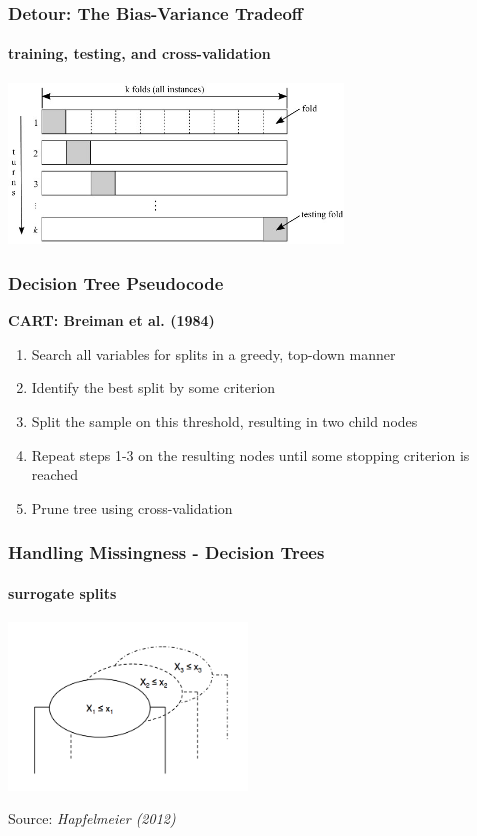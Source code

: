 \documentclass{beamer}\usepackage[]{graphicx}\usepackage[]{color}
\begin{document}

\begin{frame}
\frametitle{Detour: The Bias-Variance Tradeoff}
\framesubtitle{training, testing, and cross-validation}

\begin{center}
\includegraphics[width = 3.5in]{figure/k-fold-cross-validation.jpg}
\end{center}

\end{frame}


\begin{frame}
\frametitle{Decision Tree Pseudocode}

\textbf{CART: Breiman et al. (1984)}

\begin{enumerate}
\item Search all variables for splits in a greedy, top-down manner
\pause
\item Identify the best split by some criterion
\pause
\item Split the sample on this threshold, resulting in two child nodes
\pause
\item Repeat steps 1-3 on the resulting nodes until some stopping criterion is reached
\pause
\item Prune tree using cross-validation
\end{enumerate}

\end{frame}


\begin{frame}
\frametitle{Handling Missingness - Decision Trees}
\framesubtitle{surrogate splits}

\begin{center}
\includegraphics[width = 2.5in]{figure/surrogate_split.png}
\end{center}
\scriptsize Source: \textit{Hapfelmeier (2012)}

\end{frame}
\end{document}
